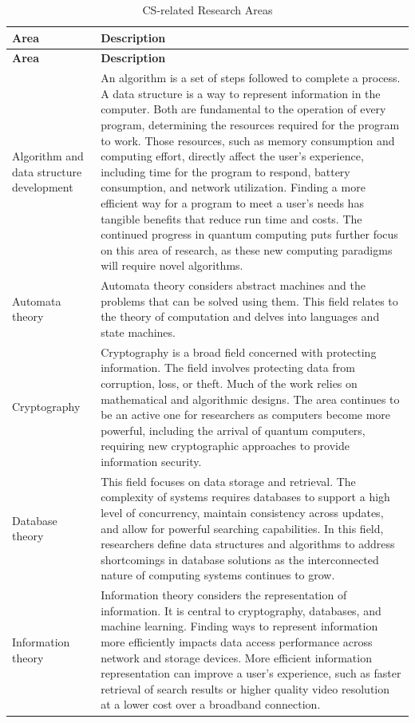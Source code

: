 \begin{longtable}[H]{p{.8in}|p{3.6in}}
	\caption{CS-related Research Areas}
	\label{tab:table1}\\
	\textbf{Area} & \textbf{Description}\\
	\hline
	\endfirsthead
	\textbf{Area} & \textbf{Description}\\
	\endhead
	\Tstrut Algorithm and data structure development & An algorithm is a set of steps followed to complete a process. A data structure is a way to represent information in the computer. Both are fundamental to the operation of every program, determining the resources required for the program to work. Those resources, such as memory consumption and computing effort, directly affect the user's experience, including time for the program to respond, battery consumption, and network utilization. Finding a more efficient way for a program to meet a user's needs has tangible benefits that reduce run time and costs. The continued progress in quantum computing puts further focus on this area of research, as these new computing paradigms will require novel algorithms.\\
	\hline
	\Tstrut Automata theory & Automata theory considers abstract machines and the problems that can be solved using them. This field relates to the theory of computation and delves into languages and state machines.\\
	\hline
	\Tstrut Cryptography & Cryptography is a broad field concerned with protecting information. The field involves protecting data from corruption, loss, or theft. Much of the work relies on mathematical and algorithmic designs. The area continues to be an active one for researchers as computers become more powerful, including the arrival of quantum computers, requiring new cryptographic approaches to provide information security.\\
	\hline
	\Tstrut Database theory & This field focuses on data storage and retrieval. The complexity of systems requires databases to support a high level of concurrency, maintain consistency across updates, and allow for powerful searching capabilities. In this field, researchers define data structures and algorithms to address shortcomings in database solutions as the interconnected nature of computing systems continues to grow.\\
	\hline
	\Tstrut Information theory & Information theory considers the representation of information. It is central to cryptography, databases, and machine learning. Finding ways to represent information more efficiently impacts data access performance across network and storage devices. More efficient information representation can improve a user's experience, such as faster retrieval of search results or higher quality video resolution at a lower cost over a broadband connection.\\

\end{longtable}
